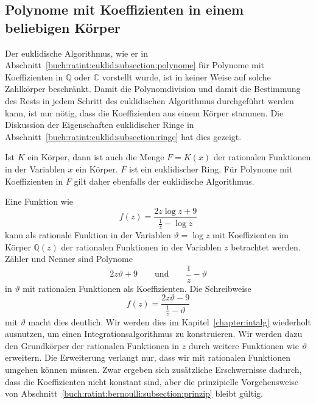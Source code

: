 %
%
%
\subsection{Polynome mit Koeffizienten in einem beliebigen Körper}
Der euklidische Algorithmus, wie er in
Abschnitt~\ref{buch:ratint:euklid:subsection:polynome}
für Polynome mit Koeffizienten in $\mathbb{Q}$ oder $\mathbb{C}$
vorstellt wurde, ist in keiner Weise auf solche Zahlkörper beschränkt.
Damit die Polynomdivision und damit die Bestimmung des Rests
in jedem Schritt des euklidischen Algorithmus durchgeführt werden kann,
ist nur nötig, dass die Koeffizienten aus einem Körper stammen.
Die Diskussion der Eigenschaften euklidischer Ringe in
Abschnitt~\ref{buch:ratint:euklid:subsection:ringe} hat dies
gezeigt.

Ist $K$ ein Körper, dann ist auch die Menge $F=K(x)$ der rationalen Funktionen
in der Variablen $x$ ein Körper.
$F$ ist ein euklidischer Ring.
Für Polynome mit Koeffizienten in $F$ gilt daher ebenfalls der
euklidische Algorithmus.

Eine Funktion wie
\[
f(z)
=
\frac{2z\log z + 9}{\frac1z-\log z}
\]
kann als rationale Funktion in der Variablen $\vartheta=\log z$
mit Koeffizienten im Körper $\mathbb{Q}(z)$ der rationalen Funktionen
in der Variablen $z$ betrachtet werden.
Zähler und Nenner sind Polynome
\[
2z\vartheta + 9
\qquad\text{und}\qquad
\frac1z -\vartheta
\]
in $\vartheta$ mit rationalen Funktionen als Koeffizienten.
Die Schreibweise
\[
f(z)
=
\frac{2z\vartheta - 9}{\frac1z-\vartheta}
\]
mit $\vartheta$ macht dies deutlich.
Wir werden dies im Kapitel~\ref{chapter:intalg} wiederholt ausnutzen,
um einen Integrationsalgorithmus zu konstruieren.
Wir werden dazu den Grundkörper der rationalen Funktionen in $z$ 
durch weitere Funktionen wie $\vartheta$ erweitern.
Die Erweiterung verlangt nur, dass wir mit rationalen Funktionen
umgehen können müssen.
Zwar ergeben sich zusätzliche Erschwernisse dadurch, dass die Koeffizienten
nicht konstant sind, aber die prinzipielle Vorgehensweise von
Abschnitt~\ref{buch:ratint:bernoulli:subsection:prinzip}
bleibt gültig.



